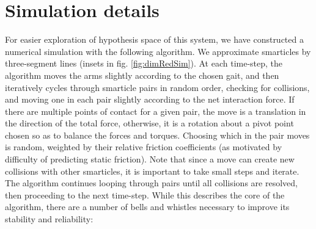 \documentclass[11pt]{article}
\renewcommand{\=}[1]{\stackrel{#1}{=}} %
\renewcommand{\(}{\left (}
\renewcommand{\)}{\right  )}
\renewcommand{\[}{\left [}
\renewcommand{\]}{\right ]}
\newcommand{\<}{\left <}
\renewcommand{\>}{\right >}
\theoremstyle{definition}
\theoremstyle{remark}
\begin{document}
\section{Simulation details} \label{app:simulation}
For easier exploration of hypothesis space of this system, we have constructed a numerical simulation with the following algorithm. We approximate smarticles by three-segment lines (insets in fig. \ref{fig:dimRedSim}). At each time-step, the algorithm moves the arms slightly according to the chosen gait, and then iteratively cycles through smarticle pairs in random order, checking for collisions, and moving one in each pair slightly according to the net interaction force. If there are multiple points of contact for a given pair, the move is a translation in the direction of the total force, otherwise, it is a rotation about a pivot point chosen so as to balance the forces and torques. Choosing which in the pair moves is random, weighted by their relative friction coefficients (as motivated by difficulty of predicting static friction). Note that since a move can create new collisions with other smarticles, it is important to take small steps and iterate. The algorithm continues looping through pairs until all collisions are resolved, then proceeding to the next time-step. While this describes the core of the algorithm, there are a number of bells and whistles necessary to improve its stability and reliability:
\end{document}
